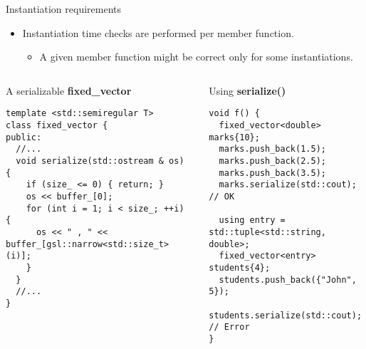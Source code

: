 \begin{frame}[t,fragile]{Instantiation requirements}
\begin{itemize}
  \item Instantiation time checks are performed per member function.
    \begin{itemize}
      \item A given member function might be correct only for some instantiations.
    \end{itemize}
\end{itemize}

\begin{columns}[T]


\begin{block}{A serializable \textbf{fixed\_vector}}
\begin{lstlisting}
template <std::semiregular T>
class fixed_vector {
public:
  //...
  void serialize(std::ostream & os) {
    if (size_ <= 0) { return; }
    os << buffer_[0];
    for (int i = 1; i < size_; ++i) {
      os << " , " << buffer_[gsl::narrow<std::size_t>(i)];
    }
  }
  //...
}
\end{lstlisting}
\end{block}

\pause
{}
\begin{block}{Using \textbf{serialize()}}
\begin{lstlisting}
void f() {
  fixed_vector<double> marks{10};
  marks.push_back(1.5);
  marks.push_back(2.5);
  marks.push_back(3.5);
  marks.serialize(std::cout); // OK

  using entry = std::tuple<std::string, double>;
  fixed_vector<entry> students{4};
  students.push_back({"John", 5});
  students.serialize(std::cout); // Error
}
\end{lstlisting}
\end{block}

\end{columns}

\end{frame}
